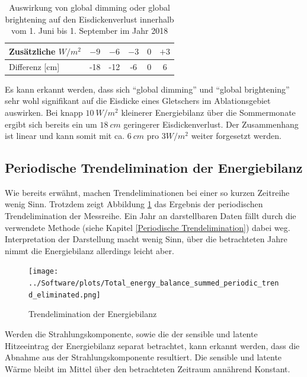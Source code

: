 \documentclass[12pt,a4paper]{article}
\begin{document}
\begin{table}[H]
\centering
{} 
\caption{Auswirkung von global dimming oder global brightening auf den Eisdickenverlust innerhalb vom 1. Juni bis 1. September im Jahr 2018}
\label{tab:Auswirkung von global dimming oder global brightening auf den Eisdickenverlust innerhalb vom 1. Juni bis 1. September im Jahr 2018}
\begin{tabular}{|l|c|c|c|c|c|}
\hline
Zusätzliche $W/m^2$       &  $-9$ & $-6$  & $-3$ & $0$ & $+3$ \\ \hline
Differenz {[}cm{]} & -18    & -12 & -6 & 0  & 6  \\ \hline
\end{tabular}
\end{table}

Es kann erkannt werden, dass sich ``global dimming'' und ``global brightening'' sehr wohl signifikant auf die Eisdicke eines Gletschers im Ablationsgebiet auswirken. Bei knapp $10~W/m^2$ kleinerer Energiebilanz über  die Sommermonate ergibt sich bereits ein um $18~cm$ geringerer Eisdickenverlust. Der Zusammenhang ist linear und kann somit mit ca. $6~cm$ pro $3 W/m^2$ weiter forgesetzt werden.\\

\subsection{Periodische Trendelimination der Energiebilanz}

Wie bereits erwähnt, machen Trendeliminationen bei einer so kurzen Zeitreihe wenig Sinn. Trotzdem zeigt Abbildung \ref{fig:Trendelimination der Energiebilanz} das Ergebnis der periodischen Trendelimination der Messreihe. Ein Jahr an darstellbaren Daten fällt durch die verwendete Methode (siehe Kapitel \ref{Periodische Trendelimination}) dabei weg. Interpretation der Darstellung macht wenig Sinn, über die betrachteten Jahre nimmt die Energiebilanz allerdings leicht aber. 

\begin{figure}[H]
\centering
\texttt{[image: ../Software/plots/Total\_energy\_balance\_summed\_periodic\_trend\_eliminated.png]}
\caption{Trendelimination der Energiebilanz}
\label{fig:Trendelimination der Energiebilanz}
\end{figure}

Werden die Strahlungskomponente, sowie die der sensible und latente Hitzeeintrag der Energiebilanz separat betrachtet, kann erkannt werden, dass  die Abnahme aus der Strahlungskomponente resultiert. Die sensible und latente Wärme bleibt im Mittel über den betrachteten Zeitraum annährend Konstant.
\end{document}
